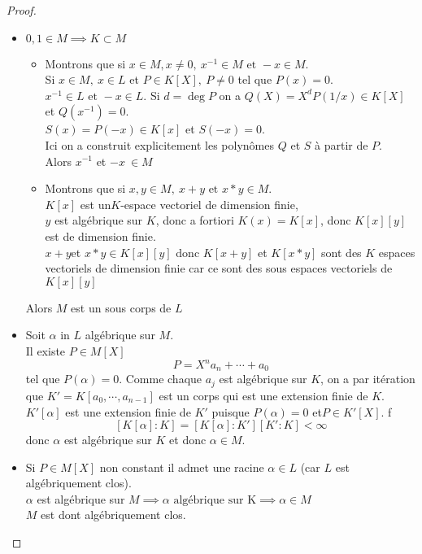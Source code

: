 \begin{proof}
	\begin{itemize}
		\item $0,1 \in M \implies K \subset M$ \\
		      \begin{itemize}
			      \item
			            Montrons que si $x \in M, x \neq 0, \  x^{-1} \in M \text{ et } -x \in M$. \\
			            Si $x \in M, \ x \in L$ et $P \in K[X], \ P \neq 0$ tel que $P (x) = 0$.\\
			            $x^{-1} \in L \text{ et } -x \in L$. Si $d = \deg P$ on a $Q(X) = X^d P(1/x) \in K[X]$ et $Q(x^{-1}) = 0$.\\
			            $S(x) = P(-x) \in K[x]$ et $S(-x) = 0$. \\
			            Ici on a construit explicitement les polynômes $Q$ et $S$ à partir de $P$.\\
			            Alors $x^{-1}$ et $-x \ \in M$
			      \item Montrons que si $x,y \in M, \  x + y \text{ et } x*y \in M$. \\
			            $K[x]$ est un$K$-espace vectoriel de dimension finie, \\
			            $y$ est algébrique sur $K$, donc a fortiori $K(x) =  K[x]$, donc $K[x][y]$ est de dimension finie.\\
			            $x+y $et $x*y\in K[x][y]$ donc $K[x+y]$ et $K[x*y]$ sont des $K$ espaces vectoriels de dimension finie car
			            ce sont des sous espaces vectoriels de $K[x][y]$
		      \end{itemize}
		      Alors $M$ est un sous corps de $L$
		\item Soit $\alpha$ in $L$ algébrique sur $M$.\\
		      Il existe $P \in M[X]$
		      $$ P = X^na_n + \cdots + a_0$$
		      tel que $P(\alpha) = 0$. Comme chaque $a_j$ est algébrique sur $K$, on a par itération que $K'=K[a_0,\cdots, a_{n-1}]$ est un corps qui est une extension finie de $K$.\\
		      $K'[\alpha]$ est une extension finie de $K'$ puisque $P(\alpha)=0$ et$P \in K'[X]$. f
		      $$ \left[K[\alpha] : K\right]  =  \left[K[\alpha] : K'\right] \left[K' : K\right] < \infty $$
		      donc $\alpha$ est algébrique sur $K$ et donc $\alpha \in M$.
		\item
		      Si $P \in M[X]$ non constant il admet une racine $\alpha \in L$ (car $L$ est algébriquement clos). \\
		      $\alpha$ est algébrique sur $M \implies \alpha \text{ algébrique sur K} \implies \alpha \in M$\ \\ %
		      $M$ est dont algébriquement clos.
	\end{itemize}
\end{proof}

